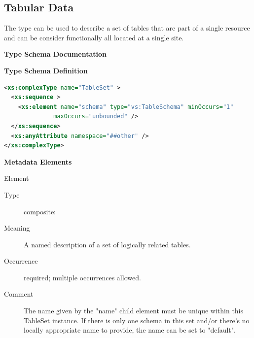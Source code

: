 \documentclass[11pt,a4paper]{ivoa}
\begin{document}

\subsection{Tabular Data}
\label{sect:table}


The  type can be used
to describe a set of tables that are part of a single resource and can
be consider functionally all located at a single site.



\begin{generated}
\begingroup
      	\renewcommand*\descriptionlabel[1]{%
      	\hbox to 5.5em{\emph{#1}\hfil}}\vspace{2ex}\noindent\textbf{ Type Schema Documentation}


\vspace{1ex}\noindent\textbf{ Type Schema Definition}

\begin{lstlisting}[language=XML,basicstyle=\footnotesize]
<xs:complexType name="TableSet" >
  <xs:sequence >
    <xs:element name="schema" type="vs:TableSchema" minOccurs="1"
              maxOccurs="unbounded" />
  </xs:sequence>
  <xs:anyAttribute namespace="##other" />
</xs:complexType>
\end{lstlisting}

\vspace{0.5ex}\noindent\textbf{ Metadata Elements}

\begingroup\small\begin{bigdescription}\item[Element \xmlel{schema}]
\begin{description}
\item[Type] composite: 
\item[Meaning] 
                A named description of a set of logically related tables.
              
\item[Occurrence] required; multiple occurrences allowed.
\item[Comment] 
                The name given by the {"}name{"} child element must
                be unique within this TableSet instance.  If there is
                only one schema in this set and/or there's no locally
                appropriate name to provide, the name can be set to
                {"}default{"}.  
              

\end{description}
\end{bigdescription}
\end{generated}
\end{document}
